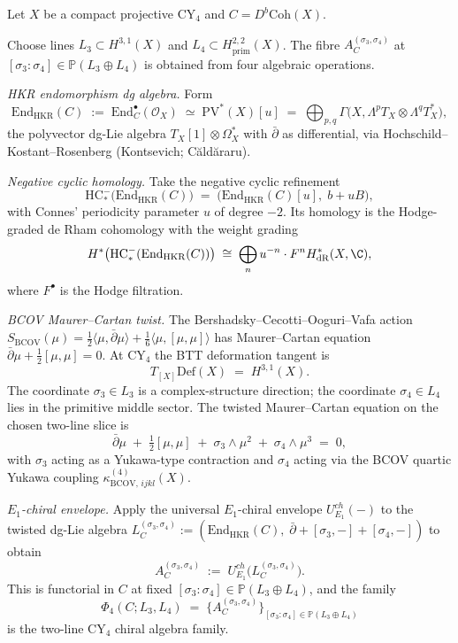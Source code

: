 Let $X$ be a compact projective CY${}_4$ and $C = D^b\mathrm{Coh}(X)$.

\begin{construction}
\label{constr:phi-4-p1-family}
Choose lines \(L_3\subset H^{3,1}(X)\) and
\(L_4\subset H^{2,2}_{\mathrm{prim}}(X)\). The fibre
\(A^{(\sigma_3,\sigma_4)}_C\) at
\([\sigma_3:\sigma_4]\in\mathbb P(L_3\oplus L_4)\) is obtained from four
algebraic operations.

\noindent\emph{HKR endomorphism dg algebra.} Form
\[
 \mathrm{End}_{\mathrm{HKR}}(C) \;:=\; \mathrm{End}^\bullet_C(\mathcal{O}_X)
 \;\simeq\; \mathrm{PV}^*(X)[u]
 \;=\; \bigoplus_{p,q} \Gamma\bigl(X, \Lambda^p T_X \otimes \Lambda^q T_X^*\bigr),
\]
the polyvector dg-Lie algebra $T_X[1] \otimes \Omega^*_X$ with $\bar\partial$ as
differential, via Hochschild--Kostant--Rosenberg \textup{(}Kontsevich;
C\u{a}ld\u{a}raru\textup{)}.

\noindent\emph{Negative cyclic homology.} Take the
negative cyclic refinement
\[
 \mathrm{HC}^-_*\bigl(\mathrm{End}_{\mathrm{HKR}}(C)\bigr)
 \;=\; \bigl(\mathrm{End}_{\mathrm{HKR}}(C)[u],\; b + uB\bigr),
\]
with Connes' periodicity parameter $u$ of degree $-2$. Its homology is the
Hodge-graded de Rham cohomology with the weight grading
\[
 H^*\bigl(\mathrm{HC}^-_*(\mathrm{End}_{\mathrm{HKR}}(C))\bigr)
 \;\cong\;
 \bigoplus_n u^{-n}\cdot F^n H^*_{\mathrm{dR}}(X, \C),
\]
where $F^\bullet$ is the Hodge filtration.

\noindent\emph{BCOV Maurer--Cartan twist.} The
Bershadsky--Cecotti--Ooguri--Vafa action
$S_{\mathrm{BCOV}}(\mu) = \tfrac{1}{2}\langle \mu, \bar\partial \mu\rangle
+ \tfrac{1}{6}\langle \mu, [\mu, \mu]\rangle$ has Maurer--Cartan equation
$\bar\partial\mu + \tfrac{1}{2}[\mu, \mu] = 0$. At CY${}_4$ the BTT deformation
tangent is
\[
 T_{[X]}\mathrm{Def}(X) \;=\; H^{3,1}(X).
\]
The coordinate \(\sigma_3\in L_3\) is a complex-structure direction; the
coordinate \(\sigma_4\in L_4\) lies in the primitive middle sector. The
twisted Maurer--Cartan equation on the chosen two-line slice is
\begin{equation}
 \label{eq:bcov-mc-twist-d4}
 \bar\partial\mu \;+\; \tfrac{1}{2}[\mu, \mu]
 \;+\; \sigma_3 \wedge \mu^2
 \;+\; \sigma_4 \wedge \mu^3 \;=\; 0,
\end{equation}
with $\sigma_3$ acting as a Yukawa-type contraction and $\sigma_4$ acting via
the BCOV quartic Yukawa coupling
$\kappa_{\mathrm{BCOV},\, ijkl}^{(4)}(X)$.

\noindent\emph{$E_1$-chiral envelope.} Apply the universal
$E_1$-chiral envelope $U^{ch}_{E_1}(-)$ to the twisted dg-Lie algebra
$L^{(\sigma_3,\sigma_4)}_C := (\mathrm{End}_{\mathrm{HKR}}(C),\; \bar\partial +
[\sigma_3, -] + [\sigma_4, -])$ to obtain
\[
 A^{(\sigma_3, \sigma_4)}_C
 \;:=\; U^{ch}_{E_1}\bigl(L^{(\sigma_3, \sigma_4)}_C\bigr).
\]
This is functorial in $C$ at fixed
\([\sigma_3 : \sigma_4] \in \mathbb{P}(L_3\oplus L_4)\), and the
family
\[
 \Phi_4(C;L_3,L_4) \;=\; \bigl\{A^{(\sigma_3, \sigma_4)}_C\bigr\}_{[\sigma_3 : \sigma_4]
 \in \mathbb{P}(L_3\oplus L_4)}
\]
is the two-line CY${}_4$ chiral algebra family.
\end{construction}

